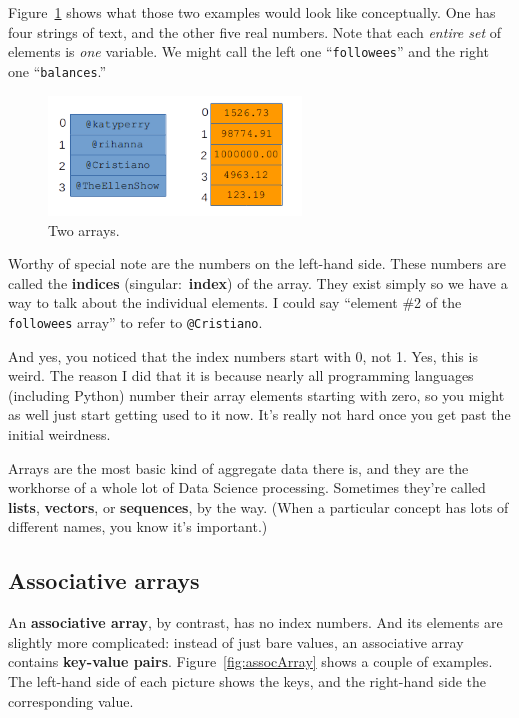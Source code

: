Figure~\ref{fig:array} shows what those two examples would look like
conceptually. One has four strings of text, and the other five real numbers.
Note that each \textit{entire set} of elements is \textit{one} variable. We
might call the left one ``\texttt{followees}'' and the right one
``\texttt{balances}.''

\begin{figure}[ht]
\centering
\includegraphics[width=0.6\textwidth]{array.png}
\caption{Two arrays.}
\label{fig:array}
\end{figure}

Worthy of special note are the numbers on the left-hand side. These numbers
are called the \textbf{indices} (singular:~\textbf{index}) of the array.
They exist simply so we have a way to talk about the individual elements. I
could say ``element \#2 of the \texttt{followees} array'' to refer to
\texttt{@Cristiano}.

And yes, you noticed that the index numbers start with 0, not 1. Yes, this is
weird. The reason I did that it is because nearly all programming languages
(including Python) number their array elements starting with zero, so you might
as well just start getting used to it now. It's really not hard once you get
past the initial weirdness.

Arrays are the most basic kind of aggregate data there is, and they are the
workhorse of a whole lot of Data Science processing. Sometimes they're called
\textbf{lists}, \textbf{vectors}, or \textbf{sequences}, by the way. (When a
particular concept has lots of different names, you know it's important.)

\subsection{Associative arrays}

An \textbf{associative array}, by contrast, has no index numbers. And its
elements are slightly more complicated: instead of just bare values, an
associative array contains \textbf{key-value pairs}.
Figure~\ref{fig:assocArray} shows a couple of examples. The left-hand side of
each picture shows the keys, and the right-hand side the corresponding value.

